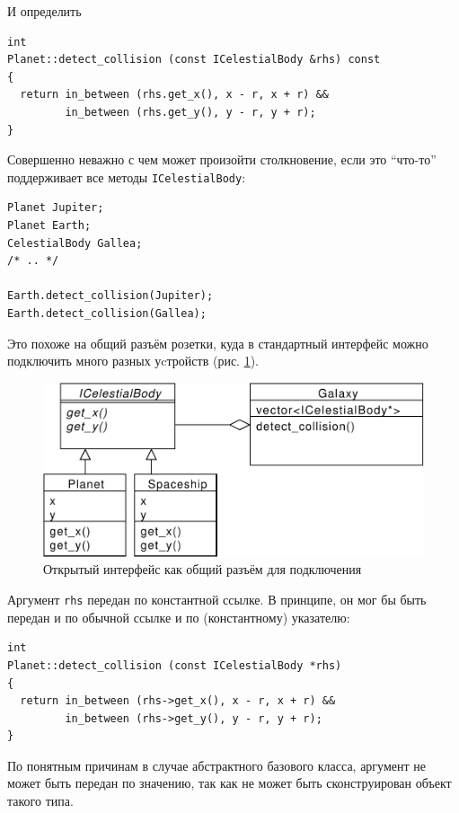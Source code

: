 \documentclass[a4paper,12pt,oneside]{article}
\begin{document}
И определить

\begin{lstlisting}
int 
Planet::detect_collision (const ICelestialBody &rhs) const
{
  return in_between (rhs.get_x(), x - r, x + r) && 
         in_between (rhs.get_y(), y - r, y + r);
}
\end{lstlisting}

Совершенно неважно с чем может произойти столкновение, если это ``что-то'' поддерживает все методы \lstinline!ICelestialBody!:

\begin{lstlisting}
Planet Jupiter;
Planet Earth;
CelestialBody Gallea;
/* .. */

Earth.detect_collision(Jupiter); 
Earth.detect_collision(Gallea);
\end{lstlisting}

Это похоже на общий разъём розетки, куда в стандартный интерфейс можно подключить много разных уcтройств (рис. \ref{fig:common-intf}).

\begin{figure}[ht]
\centering
\includegraphics[width=1.0\textwidth]{illustrations/common-intf-crop.pdf}
\caption{Открытый интерфейс как общий разъём для подключения}
\label{fig:common-intf}
\end{figure}

Аргумент \lstinline!rhs! передан по константной ссылке. В принципе, он мог бы быть передан и по обычной ссылке и по (константному) указателю:

\begin{lstlisting}
int 
Planet::detect_collision (const ICelestialBody *rhs)
{
  return in_between (rhs->get_x(), x - r, x + r) && 
         in_between (rhs->get_y(), y - r, y + r);
}
\end{lstlisting}

По понятным причинам в случае абстрактного базового класса, аргумент не может быть передан по значению, так как не может быть сконструирован объект такого типа.
\end{document}
